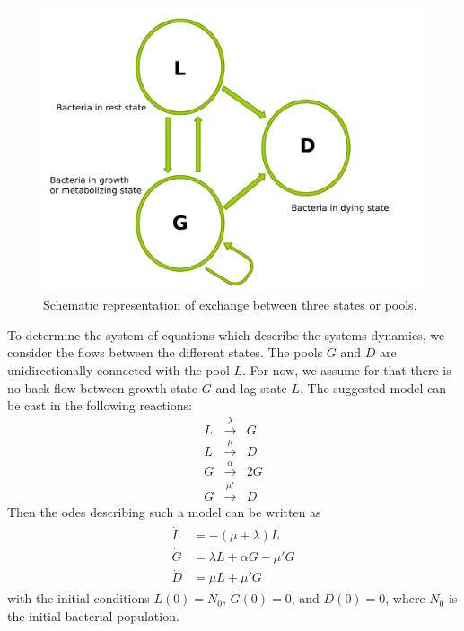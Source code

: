 \documentclass[10pt,A4paper]{article}
\numberwithin{equation}{section}
\begin{document}
\begin{figure}[t]
    \begin{center}
    \includegraphics[width=0.9\columnwidth]{Figures/TPM_fig.pdf}
    \caption{Schematic representation of exchange between three states or pools.}
    \label{fig:SchematicRep}
    \end{center}
\end{figure}
To determine the system of equations which describe the systems dynamics, we consider the flows between the different states.
The pools $G$ and $D$ are unidirectionally connected with the pool $L$.
For now, we assume for that there is no back flow between growth state $G$ and lag-state $L$.
The suggested model can be cast in the following reactions:
\begin{eqnarray}
    L &\stackrel{\lambda}{\longrightarrow} & G\\
    L &\stackrel{\mu}{\longrightarrow} & D\\
    G &\stackrel{\alpha}{\longrightarrow} & 2G\\
    G &\stackrel{\mu'}{\longrightarrow} & D
 \end{eqnarray}
Then the \acp{ode} describing such a model can be written as
\begin{align}\begin{split}
    \dot{L} &= -(\mu + \lambda) L\\
    \dot{G} &= \lambda L + \alpha G - \mu' G\\
    \dot{D} &= \mu  L + \mu' G 
\end{split}\end{align}
with the initial conditions $L(0)=N_0$, $G(0)=0$, and $D(0)=0$, where $N_0$ is the initial bacterial population.
%
\end{document}
